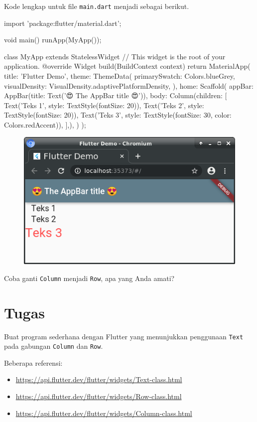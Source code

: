 \documentclass[a4paper,11pt]{article} %
\newcommand{\txtinline}[1]{\texttt{#1}}
\begin{document}
Kode lengkap untuk file \txtinline{main.dart} menjadi sebagai berikut.
\begin{dartcode}
import 'package:flutter/material.dart';

void main() {
  runApp(MyApp());
}
  
class MyApp extends StatelessWidget {
  // This widget is the root of your application.
  @override
  Widget build(BuildContext context) {
    return MaterialApp(
      title: 'Flutter Demo',
      theme: ThemeData(
        primarySwatch: Colors.blueGrey,
        visualDensity: VisualDensity.adaptivePlatformDensity,
      ),
      home: Scaffold(
        appBar: AppBar(title: Text('😍 The AppBar title 😍')),
        body: Column(children: [
          Text('Teks 1', style: TextStyle(fontSize: 20)),
          Text('Teks 2', style: TextStyle(fontSize: 20)),
          Text('Teks 3', style: TextStyle(fontSize: 30, color: Colors.redAccent)),
        ],),
      )
    );
  }
}
\end{dartcode}

\begin{figure}[H]
{\centering
\includegraphics[scale=0.75]{images/flutter_column_01.png}
\par}
\end{figure}

Coba ganti \txtinline{Column} menjadi \txtinline{Row}, apa yang Anda amati?

\section{Tugas}
Buat program sederhana dengan Flutter yang menunjukkan penggunaan
\txtinline{Text} pada gabungan \txtinline{Column} dan \txtinline{Row}.

Beberapa referensi:
\begin{itemize}
\item {\footnotesize\url{https://api.flutter.dev/flutter/widgets/Text-class.html}}
\item {\footnotesize\url{https://api.flutter.dev/flutter/widgets/Row-class.html}}
\item {\footnotesize\url{https://api.flutter.dev/flutter/widgets/Column-class.html}}
\end{itemize}



\end{document}
